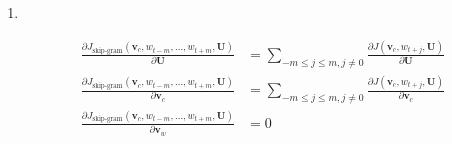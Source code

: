 \documentclass{amsart}
\theoremstyle{plain}
\theoremstyle{remark}
\numberwithin{equation}{section}
\begin{document}
\begin{enumerate}
\item \,

\[
\begin{split}
\frac {\partial J_\text{skip-gram} (\mathbf v_c, w_{t-m}, \dots, w_{t+m}, \mathbf U) } {\partial \mathbf U} &= \sum_{-m \le j \le m, j\ne 0} \frac {\partial J(\mathbf v_c, w_{t+j}, \mathbf U)} {\partial \mathbf U} \\
\frac {\partial J_\text{skip-gram} (\mathbf v_c, w_{t-m}, \dots, w_{t+m}, \mathbf U) } {\partial \mathbf v_c} &= \sum_{-m \le j \le m, j\ne 0} \frac {\partial J(\mathbf v_c, w_{t+j}, \mathbf U)} {\partial \mathbf v_c} \\
\frac {\partial J_\text{skip-gram} (\mathbf v_c, w_{t-m}, \dots, w_{t+m}, \mathbf U) } {\partial \mathbf v_w} &= 0
\end{split}
\]

\end{enumerate}
\end{document}
